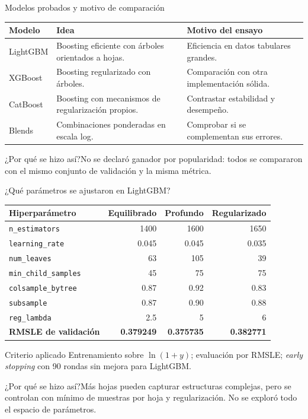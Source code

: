 \documentclass[aspectratio=169,11pt]{beamer}
\newcommand{\porq}[1]{\vspace{1.2mm}\begin{block}{¿Por qué se hizo así?}\small #1\end{block}}
\begin{document}
\begin{frame}{Modelos probados y motivo de comparación}
\footnotesize
\begin{tabular}{p{.23\linewidth}p{.43\linewidth}p{.27\linewidth}}
\toprule
\textbf{Modelo} & \textbf{Idea} & \textbf{Motivo del ensayo}\tabularnewline\midrule
LightGBM & Boosting eficiente con árboles orientados a hojas. & Eficiencia en datos tabulares grandes.\\
XGBoost & Boosting regularizado con árboles. & Comparación con otra implementación sólida.\\
CatBoost & Boosting con mecanismos de regularización propios. & Contrastar estabilidad y desempeño.\\
\midrule
Blends & Combinaciones ponderadas en escala log. & Comprobar si se complementan sus errores.\\
\bottomrule
\end{tabular}
\porq{No se declaró ganador por popularidad: todos se compararon con el mismo conjunto de validación y la misma métrica.}
\end{frame}

\begin{frame}{¿Qué parámetros se ajustaron en LightGBM?}
\scriptsize
\begin{tabular}{p{.36\linewidth}rrr}
\toprule
\textbf{Hiperparámetro} & \textbf{Equilibrado} & \textbf{Profundo} & \textbf{Regularizado}\\\midrule
\texttt{n\_estimators} & 1400 & 1600 & 1650\\
\texttt{learning\_rate} & 0.045 & 0.045 & 0.035\\
\texttt{num\_leaves} & 63 & 105 & 39\\
\texttt{min\_child\_samples} & 45 & 75 & 75\\
\texttt{colsample\_bytree} & 0.87 & 0.92 & 0.83\\
\texttt{subsample} & 0.87 & 0.90 & 0.88\\
\texttt{reg\_lambda} & 2.5 & 5 & 6\\\midrule
\textbf{RMSLE de validación} & \textbf{0.379249} & \textbf{0.375735} & \textbf{0.382771}\\
\bottomrule
\end{tabular}
\vspace{2mm}
\begin{block}{Criterio aplicado}
Entrenamiento sobre $\ln(1+y)$; evaluación por RMSLE; \emph{early stopping} con 90 rondas sin mejora para LightGBM.
\end{block}
\porq{Más hojas pueden capturar estructuras complejas, pero se controlan con mínimo de muestras por hoja y regularización. No se exploró todo el espacio de parámetros.}
\end{frame}
\end{document}

